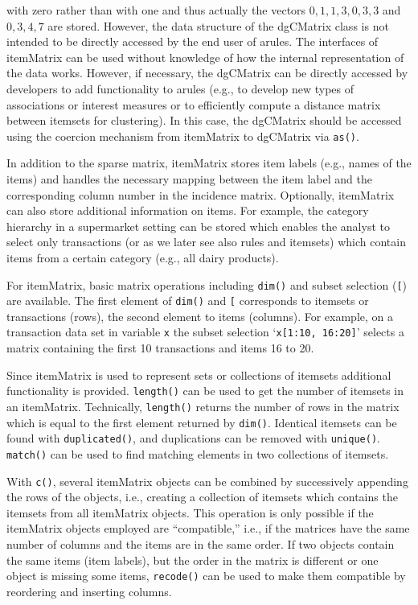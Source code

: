 \documentclass[10pt,a4paper]{article}
\newcommand{\strong}[1]{{\normalfont\fontseries{b}\selectfont #1}}
\newcommand{\class}[1]{\mbox{\textsf{#1}}}
\newcommand{\func}[1]{\mbox{\texttt{#1()}}}
\newcommand{\code}[1]{\mbox{\texttt{#1}}}
\newcommand{\pkg}[1]{\strong{#1}}
\newcommand{\samp}[1]{`\mbox{\texttt{#1}}'}
\begin{document}
with zero rather than with one and thus actually the vectors $0, 1, 1,
3, 0, 3, 3$ and $0, 3, 4, 7$ are stored.  However, the data structure of
the \class{dgCMatrix} class is not intended to be directly accessed by
the end user of \pkg{arules}. The interfaces of \class{itemMatrix} can
be used without knowledge of how the internal representation of the data
works.  However, if necessary, the \class{dgCMatrix} can be directly
accessed by developers to add functionality to \pkg{arules} (e.g., to
develop new types of associations or interest measures or to efficiently
compute a distance matrix between itemsets for clustering).  In this
case, the \class{dgCMatrix} should be accessed using the coercion
mechanism from \class{itemMatrix} to \class{dgCMatrix} via \func{as}.

In addition to the sparse matrix, \class{itemMatrix} stores item labels
(e.g., names of the items) and handles the necessary mapping between the
item label and the corresponding column number in the incidence matrix.
Optionally, \class{itemMatrix} can also store additional information on
items.  For example, the category hierarchy in a supermarket setting can
be stored which enables the analyst to select only transactions (or as
we later see also rules and itemsets) which contain items from a certain
category (e.g., all dairy products).

For \class{itemMatrix}, basic matrix operations including \func{dim} and
subset selection (\code{[}) are available.  The first element of
\func{dim} and \code{[} corresponds to itemsets or transactions (rows),
the second element to items (columns).  For example, on a transaction
data set in variable \code{x} the subset selection \samp{x[1:10, 16:20]}
selects a matrix containing the first 10 transactions and items 16 to
20.

Since \class{itemMatrix} is used to represent sets 
or collections of itemsets additional functionality is provided.
\func{length} can be used to get the number of itemsets in an
\class{itemMatrix}.
Technically, \func{length} returns the number of rows in the matrix
which is equal to the first element returned by \func{dim}.
Identical itemsets can be found with \func{duplicated}, and duplications
can be removed with \func{unique}.  \func{match} can be used to find
matching elements in two collections of itemsets.

With \func{c}, several \class{itemMatrix} objects can be combined by
successively appending the rows of the objects, i.e., creating a
collection of itemsets which contains the itemsets from all
\class{itemMatrix} objects.  This operation is only possible if the
\class{itemMatrix} objects employed are ``compatible,'' i.e., if the
matrices have the same number of columns and the items are in the same
order.  If two objects contain the same items (item labels), but the
order in the matrix is different or one object is missing some items,
\func{recode} can be used to make them compatible by reordering and
inserting columns.
\end{document}
